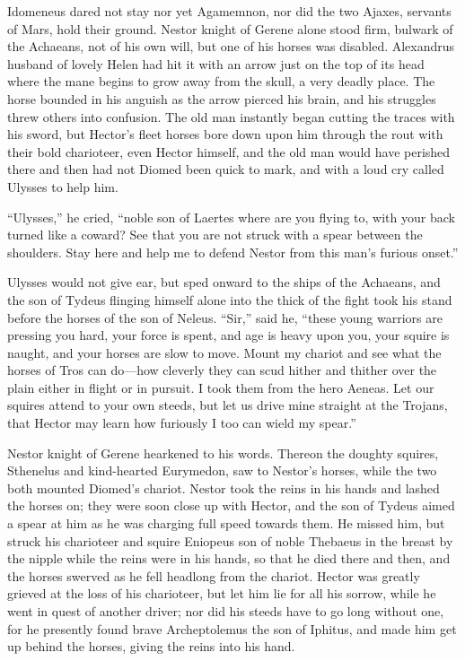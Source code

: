 Idomeneus dared not stay nor yet Agamemnon, nor did the two Ajaxes,
servants of Mars, hold their ground. Nestor knight of Gerene alone stood
firm, bulwark of the Achaeans, not of his own will, but one of his horses
was disabled. Alexandrus husband of lovely Helen had hit it with an arrow
just on the top of its head where the mane begins to grow away from the
skull, a very deadly place. The horse bounded in his anguish as the arrow
pierced his brain, and his struggles threw others into confusion. The old
man instantly began cutting the traces with his sword, but Hector’s fleet
horses bore down upon him through the rout with their bold charioteer,
even Hector himself, and the old man would have perished there and then
had not Diomed been quick to mark, and with a loud cry called Ulysses to
help him.

“Ulysses,” he cried, “noble son of Laertes where are you flying to, with
your back turned like a coward? See that you are not struck with a spear
between the shoulders. Stay here and help me to defend Nestor from this
man’s furious onset.”

Ulysses would not give ear, but sped onward to the ships of the Achaeans,
and the son of Tydeus flinging himself alone into the thick of the fight
took his stand before the horses of the son of Neleus. “Sir,” said he,
“these young warriors are pressing you hard, your force is spent, and age
is heavy upon you, your squire is naught, and your horses are slow to
move. Mount my chariot and see what the horses of Tros can do—how
cleverly they can scud hither and thither over the plain either in flight
or in pursuit. I took them from the hero Aeneas. Let our squires attend to
your own steeds, but let us drive mine straight at the Trojans, that
Hector may learn how furiously I too can wield my spear.”

Nestor knight of Gerene hearkened to his words. Thereon the doughty
squires, Sthenelus and kind-hearted Eurymedon, saw to Nestor’s horses,
while the two both mounted Diomed’s chariot. Nestor took the reins in his
hands and lashed the horses on; they were soon close up with Hector, and
the son of Tydeus aimed a spear at him as he was charging full speed
towards them. He missed him, but struck his charioteer and squire Eniopeus
son of noble Thebaeus in the breast by the nipple while the reins were in
his hands, so that he died there and then, and the horses swerved as he
fell headlong from the chariot. Hector was greatly grieved at the loss of
his charioteer, but let him lie for all his sorrow, while he went in quest
of another driver; nor did his steeds have to go long without one, for he
presently found brave Archeptolemus the son of Iphitus, and made him get
up behind the horses, giving the reins into his hand.

